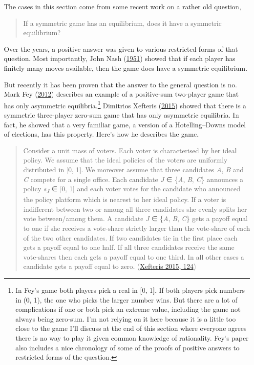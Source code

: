 \documentclass[
  12pt,
  letterpaper,
  DIV=11,
  numbers=noendperiod]{scrreprt}
\begin{document}
The cases in this section come from some recent work on a rather old
question,

\begin{quote}
If a symmetric game has an equilibrium, does it have a symmetric
equilibrium?
\end{quote}

Over the years, a positive answer was given to various restricted forms
of that question. Most importantly, John Nash
(\protect\hyperlink{ref-Nash1951}{1951}) showed that if each player has
finitely many moves available, then the game does have a symmetric
equilibrium.

But recently it has been proven that the answer to the general question
is no. Mark Fey (\protect\hyperlink{ref-Fey2012}{2012}) describes an
example of a positive-sum two-player game that has only asymmetric
equilibria.\footnote{In Fey's game both players pick a real in {[}0,
  1{]}. If both players pick numbers in (0, 1), the one who picks the
  larger number wins. But there are a lot of complications if one or
  both pick an extreme value, including the game not always being
  zero-sum. I'm not relying on it here because it is a little too close
  to the game I'll discuss at the end of this section where everyone
  agrees there is no way to play it given common knowledge of
  rationality. Fey's paper also includes a nice chronology of some of
  the proofs of positive answers to restricted forms of the question.}
Dimitrios Xefteris (\protect\hyperlink{ref-Xefteris2015}{2015}) showed
that there is a symmetric three-player zero-sum game that has only
asymmetric equilibria. In fact, he showed that a very familiar game, a
version of a Hotelling--Downs model of elections, has this property.
Here's how he describes the game.

\begin{quote}
Consider a unit mass of voters. Each voter is characterised by her ideal
policy. We assume that the ideal policies of the voters are uniformly
distributed in {[}0, 1{]}. We moreover assume that three candidates
\emph{A}, \emph{B} and \emph{C} compete for a single office. Each
candidate \emph{J} ∈ \{\emph{A}, \emph{B}, \emph{C}\} announces a policy
\emph{s\textsubscript{J}} ∈ {[}0, 1{]} and each voter votes for the
candidate who announced the policy platform which is nearest to her
ideal policy. If a voter is indifferent between two or among all three
candidates she evenly splits her vote between/among them. A candidate
\emph{J} ∈ \{\emph{A}, \emph{B}, \emph{C}\} gets a payoff equal to one
if she receives a vote-share strictly larger than the vote-share of each
of the two other candidates. If two candidates tie in the first place
each gets a payoff equal to one half. If all three candidates receive
the same vote-shares then each gets a payoff equal to one third. In all
other cases a candidate gets a payoff equal to zero.
(\protect\hyperlink{ref-Xefteris2015}{Xefteris 2015, 124})
\end{quote}
\end{document}
